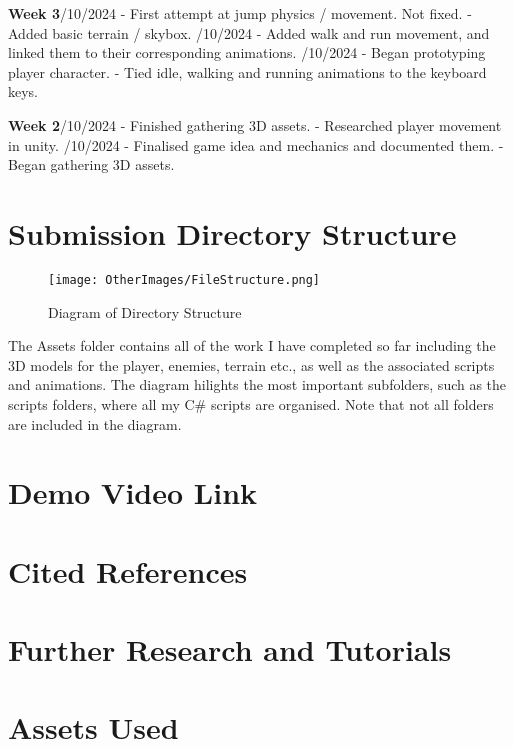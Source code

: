 \documentclass[]{final_report}
\begin{document}
\textbf{Week 3}/10/2024
\newline- First attempt at jump physics / movement. Not fixed.
\newline- Added basic terrain / skybox.
/10/2024
\newline- Added walk and run movement, and linked them to their corresponding animations.
/10/2024
\newline- Began prototyping player character.
\newline- Tied idle, walking and running animations to the keyboard keys.

\textbf{Week 2}/10/2024
\newline- Finished gathering 3D assets.
\newline- Researched player movement in unity.
/10/2024
\newline- Finalised game idea and mechanics and documented them.
\newline- Began gathering 3D assets.

\newpage
\section{Submission Directory Structure}
\begin{figure}[h!]
    \centering
    \texttt{[image: OtherImages/FileStructure.png]}
    \caption{Diagram of Directory Structure}
    \label{fig:label_name2}
\end{figure}
The Assets folder contains all of the work I have completed so far including the 3D models for the player, enemies, terrain etc., as well as the associated scripts and animations. The diagram hilights the most important subfolders, such as the scripts folders, where all my C\# scripts are organised. Note that not all folders are included in the diagram.
\section{Demo Video Link}

\newpage


\section{Cited References}
\section{Further Research and Tutorials}
\section{Assets Used}
\label{endpage}
\end{document}
